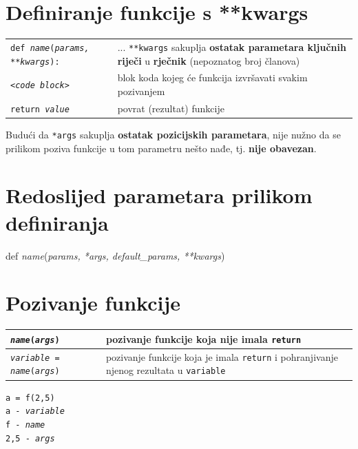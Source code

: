 \documentclass[10pt]{article}
\begin{document}
    \section*{\color{NavyBlue} Definiranje funkcije s **kwargs}
    \begin{tabular}{|>{\tt}p{9.00cm}|>{}p{15.50cm}|}
        \hline
        def \textit{name}(\textit{params, **kwargs}): & ... \texttt{**kwargs} sakuplja \textbf{ostatak parametara ključnih riječi} u \textbf{rječnik} (nepoznatog broj članova)
        \\
        \hspace{5mm}\textit{<code block}> & blok koda kojeg će funkcija izvršavati svakim pozivanjem
        \\
        \hspace{5mm}return \textit{value} & povrat (rezultat) funkcije
        \\ \hline
    \end{tabular}
    \begin{center}
        \footnotesize
        Budući da \texttt{*args} sakuplja \textbf{ostatak pozicijskih parametara}, nije nužno da se prilikom poziva funkcije u tom parametru nešto nađe, tj. \textbf{nije obavezan}.
    \end{center}

    \section*{\color{NavyBlue} Redoslijed parametara prilikom definiranja}
    \begin{center}
        \large \ttfamily
        def \textit{name}(\textit{params, *args, default\_params, **kwargs})
    \end{center}

    \section*{\color{NavyBlue} Pozivanje funkcije}
    \begin{tabular}{|>{\tt}p{9.00cm}|>{}p{15.50cm}|}
        \hline
        \textit{name}(\textit{args})                           & pozivanje funkcije koja nije imala \texttt{return}
        \\ \hline
        \textit{variable} = \textit{name}(\textit{args})       & pozivanje funkcije koja je imala \texttt{return} i pohranjivanje njenog rezultata u \texttt{variable}
        \\ \hline
    \end{tabular}
    \begin{center}
        \footnotesize
        \texttt{a = f(2,5)} \\
        \texttt{a - \textit{variable}} \\
        \texttt{f - \textit{name}} \\
        \texttt{2,5 - \textit{args}} \\
    \end{center}
    
\end{document}
